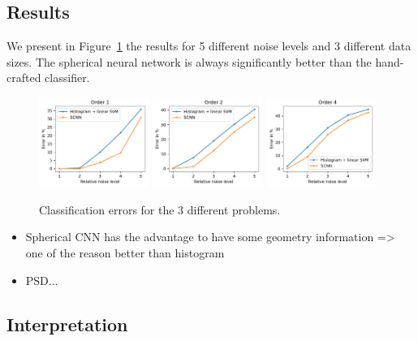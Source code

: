 \documentclass[final,twocolumn,3p,times,authoryear]{elsarticle}
\newcommand{\nati}[1]{{\color[rgb]{.1,.6,.1}{#1}}}
\newcommand{\assign}[1]{{\color[rgb]{.8,.5,.8}{Assigned: #1 }}}
\newcommand{\1}{\b{1}}              %
\newcommand{\0}{\b{0}}              %
\begin{document}
\subsection{Results}
\assign{Nathanaël, Tomek}

We present in Figure~\ref{fig:results} the results for 5 different noise levels and $3$ different data sizes. The spherical neural network is always significantly better than the hand-crafted classifier.

\begin{figure}[!ht]
\centering
\includegraphics[width=0.32\textwidth]{figures/result_order1.pdf}
\includegraphics[width=0.32\textwidth]{figures/result_order2.pdf}
\includegraphics[width=0.32\textwidth]{figures/result_order4.pdf}
\caption{Classification errors for the 3 different problems. \nati{TODO: order is not correct} }
\label{fig:results}
\end{figure}

\begin{itemize}
	\item Spherical CNN has the advantage to have some geometry information => one of the reason better than histogram
	\item PSD...
\end{itemize}



\subsection{Interpretation}
\assign{Nathanaël, Tomek, Michaël}
\end{document}
